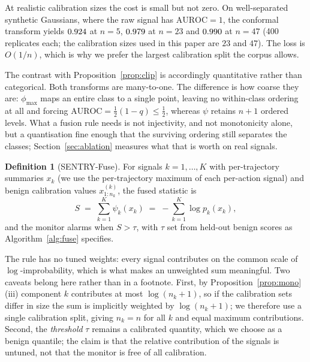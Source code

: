 \documentclass[preprint,12pt,authoryear]{elsarticle}
\theoremstyle{definition}
\newtheorem{definition}{Definition}
\begin{document}
At realistic calibration sizes the cost is small but not zero. On well-separated
synthetic Gaussians, where the raw signal has $\mathrm{AUROC} = 1$, the conformal
transform yields $0.924$ at $n=5$, $0.979$ at $n=23$ and
$0.990$ at $n=47$ (400 replicates each; the calibration sizes used in this paper
are $23$ and $47$). The loss is $O(1/n)$, which is why we prefer the largest
calibration split the corpus allows.

The contrast with Proposition~\ref{prop:clip} is accordingly quantitative rather
than categorical. Both transforms are many-to-one. The difference is how coarse
they are: $\phi_{\max}$ maps an entire class to a single point, leaving no
within-class ordering at all and forcing
$\mathrm{AUROC} = \tfrac{1}{2}(1-q) \le \tfrac{1}{2}$, whereas $\psi$ retains
$n+1$ ordered levels. What a fusion rule needs is not injectivity, and not
monotonicity alone, but a quantisation fine enough that the surviving ordering
still separates the classes; Section~\ref{sec:ablation} measures what that is
worth on real signals.

\begin{definition}[SENTRY-Fuse]
For signals $k = 1,\dots,K$ with per-trajectory summaries $x_k$ (we use the
per-trajectory maximum of each per-action signal) and benign calibration values
$x^{(k)}_{1:n_k}$, the fused statistic is
\begin{equation}\label{eq:fuse}
S \;=\; \sum_{k=1}^{K} \psi_k(x_k) \;=\; -\sum_{k=1}^{K} \log p_k(x_k),
\end{equation}
and the monitor alarms when $S > \tau$, with $\tau$ set from held-out benign scores
as Algorithm~\ref{alg:fuse} specifies.
\end{definition}

The rule has no tuned weights: every signal contributes on the common scale of
$\log$-improbability, which is what makes an unweighted sum meaningful. Two
caveats belong here rather than in a footnote. First, by
Proposition~\ref{prop:mono}(iii) component $k$ contributes at most
$\log(n_k{+}1)$, so if the calibration sets differ in size the sum is implicitly
weighted by $\log(n_k{+}1)$; we therefore use a single calibration split, giving
$n_k = n$ for all $k$ and equal maximum contributions. Second, the
\emph{threshold} $\tau$ remains a calibrated quantity, which we choose as a
benign quantile; the claim is that the relative contribution of the signals is
untuned, not that the monitor is free of all calibration.
\end{document}
